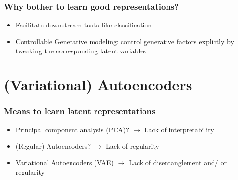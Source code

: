 \documentclass{beamer}
\theoremstyle{definition}
\begin{document}
    \begin{frame}
        \frametitle{Why bother to learn good representations?}
        \begin{itemize}
          \item Facilitate downstream tasks like classification
          \item Controllable Generative modeling: control generative factors explictly by tweaking the corresponding latent variables
        \end{itemize}
      \end{frame}

    \section{(Variational) Autoencoders}
    \begin{frame}
      \frametitle{Means to learn latent representations}
      \begin{itemize}
        \item Principal component analysis (PCA)? $\rightarrow$ Lack of interpretability
        \item (Regular) Autoencoders? $\rightarrow$ Lack of regularity
        \item Variational Autoencoders (VAE) $\rightarrow$ Lack of disentanglement and/ or regularity
      \end{itemize}
    \end{frame}
\end{document}
